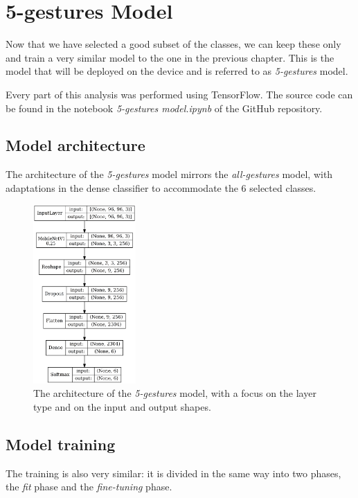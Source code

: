 \documentclass{Configuration_Files/PoliMi3i_thesis}
\begin{document}
\chapter{5-gestures Model}
\label{ch:5-model}%
Now that we have selected a good subset of the classes, we can keep these only and train a very similar model to the one in the previous chapter. This is the model that will be deployed on the device and is referred to as \textit{5-gestures} model. 

Every part of this analysis was performed using TensorFlow. The source code can be found in the notebook \textit{5-gestures model.ipynb} of the GitHub repository. 


\section{Model architecture}
\label{sec:5-arch}
The architecture of the \textit{5-gestures} model mirrors the \textit{all-gestures} model, with adaptations in the dense classifier to accommodate the 6 selected classes.

\begin{figure}[H]
    \centering
    \includegraphics[width=0.35\textwidth]{Figures/5-gestures/5_model.png}
    \caption{The architecture of the \textit{5-gestures} model, with a focus on the layer type and on the input and output shapes.}
    \label{fig:5_architecture}
\end{figure}


\section{Model training}
\label{sec:5-training}
The training is also very similar: it is divided in the same way into two phases, the \textit{fit} phase and the \textit{fine-tuning} phase. 
\end{document}
